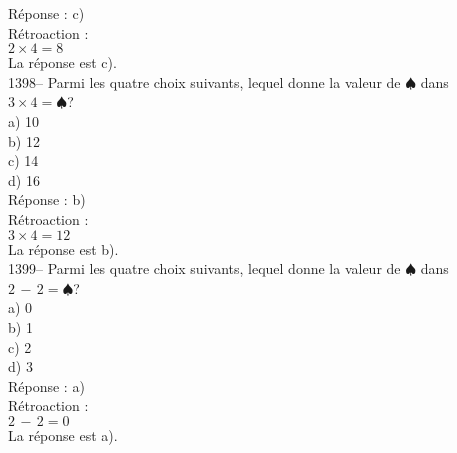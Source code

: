 ﻿\documentclass[letterpaper, 12pt]{article}
\begin{document}
R\'eponse : c)\\

R\'etroaction : \\
$2\times4=8$\\
La r\'eponse est c).\\

1398-- Parmi les quatre choix suivants, lequel donne la valeur de
$\spadesuit$ dans $3\times4=\spadesuit$?\\
a) 10\\
b) 12\\
c) 14\\
d) 16\\

R\'eponse : b)\\

R\'etroaction : \\
$3\times4=12$\\
La r\'eponse est b).\\

1399-- Parmi les quatre choix suivants, lequel donne la valeur de
$\spadesuit$ dans $2\,-\,2=\spadesuit$?\\
a) 0\\
b) 1\\
c) 2\\
d) 3\\

R\'eponse : a)\\

R\'etroaction : \\
$2\,-\,2=0$\\
La r\'eponse est a).\\
\end{document}
